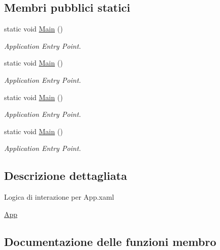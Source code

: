 \subsection*{Membri pubblici statici}
\begin{DoxyCompactItemize}
\item 
static void \mbox{\hyperlink{classclient__app_1_1_app_a417dbddda5b9e88a0222c83bce99b95b}{Main}} ()
\begin{DoxyCompactList}\small\item\em Application Entry Point. \end{DoxyCompactList}\item 
static void \mbox{\hyperlink{classclient__app_1_1_app_a417dbddda5b9e88a0222c83bce99b95b}{Main}} ()
\begin{DoxyCompactList}\small\item\em Application Entry Point. \end{DoxyCompactList}\item 
static void \mbox{\hyperlink{classclient__app_1_1_app_a417dbddda5b9e88a0222c83bce99b95b}{Main}} ()
\begin{DoxyCompactList}\small\item\em Application Entry Point. \end{DoxyCompactList}\item 
static void \mbox{\hyperlink{classclient__app_1_1_app_a417dbddda5b9e88a0222c83bce99b95b}{Main}} ()
\begin{DoxyCompactList}\small\item\em Application Entry Point. \end{DoxyCompactList}\end{DoxyCompactItemize}


\subsection{Descrizione dettagliata}
Logica di interazione per App.\+xaml 

\mbox{\hyperlink{classclient__app_1_1_app}{App}}

\subsection{Documentazione delle funzioni membro}
\mbox{\label{classclient__app_1_1_app_ab1406ddeb1d09aa8432ce1372c9e5e3d}} 
